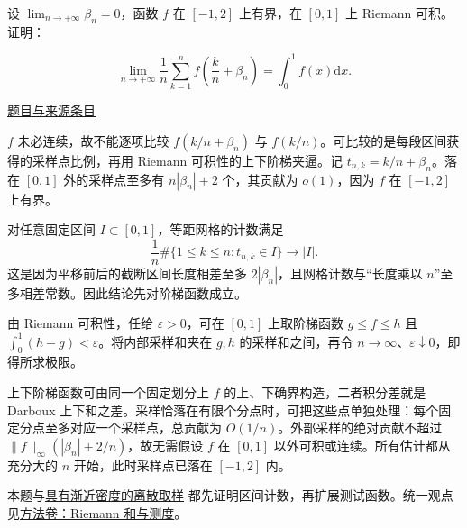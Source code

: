 \documentclass[12pt,fontset=fandol]{ctexart}
\begin{document}
\begin{example}[来源序号5]\label{ex:ch04-14th-A:5}\label{pr:ch04-14th-A:5}

设 $\lim_{n\rightarrow+\infty}\beta_{n}=0$，函数 $f$ 在 $[-1,2]$ 上有界，在 $[0,1]$ 上 Riemann 可积。证明：

\[
\lim_{n\rightarrow+\infty}\frac{1}{n}\sum_{k=1}^{n}f\left(\frac{k}{n}+\beta_{n}\right)=\int_{0}^{1}f(x)\mathrm{d}x.
\]

\par\href{https://github.com/lzxcr/cmc-mathematics/blob/64916fa1fdbc3e444a652eca204d5669058ee321/src/problems/preliminary/14/05.md}{题目与来源条目}

\end{example}

\begin{solve}\label{ans:ch04-14th-A:5}

$f$ 未必连续，故不能逐项比较 $f(k/n+\beta_n)$ 与 $f(k/n)$。可比较的是每段区间获得的采样点比例，再用 Riemann 可积性的上下阶梯夹逼。记 $t_{n,k}=k/n+\beta_n$。落在 $[0,1]$ 外的采样点至多有 $n|\beta_n|+2$ 个，其贡献为 $o(1)$，因为 $f$ 在 $[-1,2]$ 上有界。

对任意固定区间 $I\subset[0,1]$，等距网格的计数满足
\[
\frac1n\#\{1\leq k\leq n:t_{n,k}\in I\}\longrightarrow |I|.
\]
这是因为平移前后的截断区间长度相差至多 $2|\beta_n|$，且网格计数与“长度乘以 $n$”至多相差常数。因此结论先对阶梯函数成立。

由 Riemann 可积性，任给 $\varepsilon>0$，可在 $[0,1]$ 上取阶梯函数 $g\leq f\leq h$ 且 $\int_0^1(h-g)<\varepsilon$。将内部采样和夹在 $g,h$ 的采样和之间，再令 $n\to\infty$、$\varepsilon\downarrow0$，即得所求极限。

上下阶梯函数可由同一个固定划分上 $f$ 的上、下确界构造，二者积分差就是 Darboux 上下和之差。采样恰落在有限个分点时，可把这些点单独处理：每个固定分点至多对应一个采样点，总贡献为 $O(1/n)$。外部采样的绝对贡献不超过 $\|f\|_\infty(|\beta_n|+2/n)$，故无需假设 $f$ 在 $[0,1]$ 以外可积或连续。所有估计都从充分大的 $n$ 开始，此时采样点已落在 $[-1,2]$ 内。

\end{solve}

\begin{remark}[方法与条件]本题与\hyperref[pr:ch01-17th-A:6]{具有渐近密度的离散取样} 都先证明区间计数，再扩展测试函数。统一观点见\hyperref[app:integration-riemann]{方法卷：Riemann 和与测度}。\end{remark}
\end{document}
